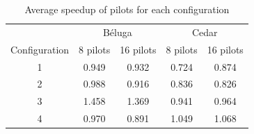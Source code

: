    \begin{table}                                                                    
	\centering                                                                       
	\begin{tabular}{c|c|c|c|c}                                                             
	    {} & \multicolumn{2}{c}{B\'eluga} & \multicolumn{2}{c}{Cedar}\\
	\rowcolor{headcolor}                                                             
	Configuration & 8 pilots & 16 pilots & 8 pilots & 16 pilots\\                               
	\hline                                                                           
	1 & 0.949 & 0.932 & 0.724 & 0.874\\                                               
	2 & 0.988 & 0.916 & 0.836 & 0.826\\                                               
	3 & 1.458 & 1.369 & 0.941 & 0.964\\
	4 & 0.970 & 0.891 & 1.049 & 1.068\\
	\end{tabular}                                                                    
	\setlength{\belowcaptionskip}{-10pt}                                             
	\caption{Average speedup of pilots for each configuration}                                                    
	\label{table:speedup}                                                            
    \end{table} 
    
    
    
